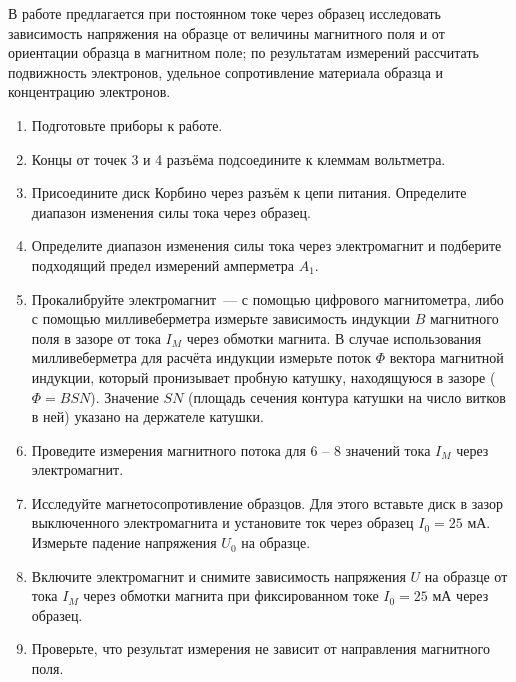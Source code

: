 \begin{lab:task}

В работе предлагается при постоянном токе через образец исследовать зависимость напряжения на образце от величины магнитного поля и от ориентации образца в магнитном поле; по результатам измерений рассчитать подвижность электронов, удельное сопротивление материала образца и концентрацию электронов.

\begin{enumerate}

\item{ Подготовьте приборы к работе.}

\item{ Концы от точек 3 и 4 разъёма подсоедините к клеммам вольтметра.}

\item{ Присоедините диск Корбино через разъём к цепи питания. Определите диапазон изменения силы тока через образец.}

\item{ Определите диапазон изменения силы тока через электромагнит и подберите подходящий предел измерений амперметра $A_1$.}

\item{ Прокалибруйте электромагнит~--- с помощью цифрового магнитометра, либо с помощью милливеберметра измерьте зависимость индукции $B$ магнитного поля в зазоре от тока $I_M$ через обмотки магнита. В случае использования милливеберметра для расчёта индукции измерьте поток $\Phi$ вектора магнитной индукции, который пронизывает пробную катушку, находящуюся в зазоре ($\Phi=BSN$). Значение $SN$ (площадь сечения контура катушки на число витков в ней) указано на держателе катушки.}

\item{ Проведите измерения магнитного потока для 6 -- 8 значений тока $I_M$ через электромагнит.}

\item{ Исследуйте магнетосопротивление образцов. Для этого вставьте диск в зазор выключенного электромагнита и установите ток через образец $I_0=25$ мА. Измерьте падение напряжения $U_0$ на образце.}

\item{ Включите электромагнит и снимите зависимость напряжения $U$ на образце от тока $I_M$ через обмотки магнита при фиксированном токе $I_0=25$ мА через образец.}

\item{ Проверьте, что результат измерения не зависит от направления магнитного поля.}


\end{enumerate}
\end{lab:task}
